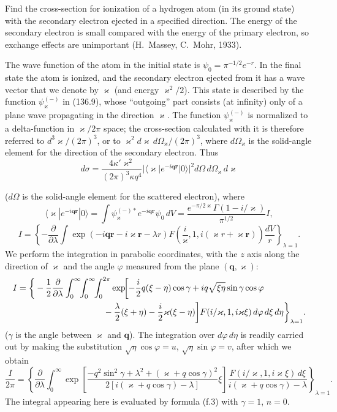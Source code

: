  Find the cross-section for ionization of a hydrogen atom
(in its ground state) with the secondary electron ejected in a specified
direction. The energy of the secondary electron is small compared with the
energy of the primary electron, so exchange effects are unimportant
(H.~Massey, C.~Mohr, 1933).

\SolutionHeading The wave function of the atom in the initial state is
$\psi_0=\pi^{-1/2}e^{-r}$. In the final state the atom is ionized, and the
secondary electron ejected from it has a wave vector that we denote by
$\boldsymbol\varkappa$ (and energy $\varkappa^2/2$). This state is described by
the function $\psi_{\boldsymbol\varkappa}^{(-)}$ in (136.9), whose ``outgoing''
part consists (at infinity) only of a plane wave propagating in the direction
$\boldsymbol\varkappa$. The function $\psi_{\boldsymbol\varkappa}^{(-)}$ is
normalized to a delta-function in $\boldsymbol\varkappa/2\pi$ space; the
cross-section calculated with it is therefore referred to
$d^3\varkappa/(2\pi)^3$, or to
$\varkappa^2d\varkappa\,d\Omega_{\varkappa}/(2\pi)^3$, where
$d\Omega_{\varkappa}$ is the solid-angle element for the direction of the
secondary electron. Thus
\[
 d\sigma=\frac{4\kappa'\varkappa^2}{(2\pi)^3\kappa q^4}
 |\langle\boldsymbol\varkappa|e^{-i\mathbf q\mathbf r}|0\rangle|^2
 d\Omega\,d\Omega_{\varkappa}\,d\varkappa
\]

($d\Omega$ is the solid-angle element for the scattered electron), where
\[
 \langle\boldsymbol\varkappa|e^{-i\mathbf q\mathbf r}|0\rangle
 =\int\psi_{\boldsymbol\varkappa}^{(-)*}e^{-i\mathbf q\mathbf r}\psi_0\,dV
 =\frac{e^{-\pi/2\varkappa}\Gamma(1-i/\varkappa)}{\pi^{1/2}}I,
\]
\[
 I=\left\{-\frac\partial{\partial\lambda}\int
 \exp(-i\mathbf q\mathbf r-i\boldsymbol\varkappa\mathbf r-\lambda r)
 F\!\left(\frac i\varkappa,1,i(\varkappa r+\boldsymbol\varkappa\mathbf r)\right)
 \frac{dV}{r}\right\}_{\lambda=1}.
\]
We perform the integration in parabolic coordinates, with the $z$ axis along
the direction of $\boldsymbol\varkappa$ and the angle $\varphi$ measured from
the plane $(\mathbf q,\boldsymbol\varkappa)$:
\[
\begin{split}
 I=\biggl\{&-\frac12\frac\partial{\partial\lambda}
 \int_0^\infty\!\!\int_0^\infty\!\!\int_0^{2\pi}
 \exp\!\biggl[-\frac i2q(\xi-\eta)\cos\gamma
 +iq\sqrt{\xi\eta}\sin\gamma\cos\varphi\\
 &\hspace{28mm}-\frac\lambda2(\xi+\eta)-\frac i2\varkappa(\xi-\eta)\biggr]
 F(i/\varkappa,1,i\varkappa\xi)\,d\varphi\,d\xi\,d\eta\biggr\}_{\lambda=1}.
\end{split}
\]
($\gamma$ is the angle between $\boldsymbol\varkappa$ and $\mathbf q$). The
integration over $d\varphi\,d\eta$ is readily carried out by making the
substitution $\sqrt\eta\cos\varphi=u$, $\sqrt\eta\sin\varphi=v$, after which
we obtain
\[
 \frac I{2\pi}=\left\{\frac\partial{\partial\lambda}\int_0^\infty
 \exp\!\left[\frac{-q^2\sin^2\gamma+\lambda^2+(\varkappa+q\cos\gamma)^2}
 {2[i(\varkappa+q\cos\gamma)-\lambda]}\xi\right]
 \frac{F(i/\varkappa,1,i\varkappa\xi)\,d\xi}{i(\varkappa+q\cos\gamma)-\lambda}
 \right\}_{\lambda=1}.
\]
The integral appearing here is evaluated by formula (f.3) with $\gamma=1$,
$n=0$.

